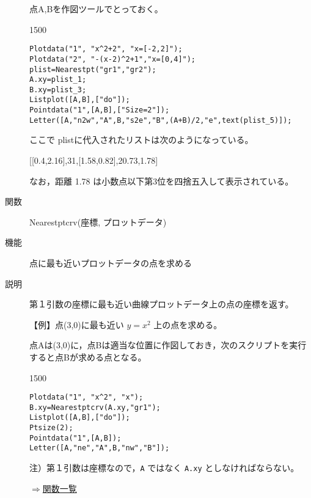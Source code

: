 \documentclass[papersize,a4paper,10pt,uplatex]{jsarticle}
\begin{document}
\begin{description}
点A,Bを作図ツールでとっておく。

\begin{layer}{150}{0}
\end{layer}

\begin{verbatim}
Plotdata("1", "x^2+2", "x=[-2,2]");
Plotdata("2", "-(x-2)^2+1","x=[0,4]");
plist=Nearestpt("gr1","gr2");
A.xy=plist_1;
B.xy=plist_3;
Listplot([A,B],["do"]);
Pointdata("1",[A,B],["Size=2"]);
Letter([A,"n2w","A",B,"s2e","B",(A+B)/2,"e",text(plist_5)]);
\end{verbatim}

ここで plistに代入されたリストは次のようになっている。

\hspace{10mm}[[0.4,2.16],31,[1.58,0.82],20.73,1.78] 

なお，距離 1.78 は小数点以下第3位を四捨五入して表示されている。

\vspace{\baselineskip}
\hypertarget{nearestptcrv}{}
\item[関数]Nearestptcrv(座標, プロットデータ)
\item[機能]点に最も近いプロットデータの点を求める
\item[説明]第１引数の座標に最も近い曲線プロットデータ上の点の座標を返す。

\vspace{\baselineskip}
【例】点(3,0)に最も近い $y=x^2$ 上の点を求める。

点Aは(3,0)に，点Bは適当な位置に作図しておき，次のスクリプトを実行すると点Bが求める点となる。

\begin{layer}{150}{0}
\end{layer}

\begin{verbatim}
Plotdata("1", "x^2", "x");
B.xy=Nearestptcrv(A.xy,"gr1");
Listplot([A,B],["do"]);
Ptsize(2);
Pointdata("1",[A,B]);
Letter([A,"ne","A",B,"nw","B"]);
\end{verbatim}

\vspace{\baselineskip}
\vspace{\baselineskip}
注）第１引数は座標なので，\verb|A| ではなく \verb|A.xy| としなければならない。

\begin{flushright}\hyperlink{functionlist}{$\Rightarrow$関数一覧}\end{flushright}


\end{description}
\end{document}

